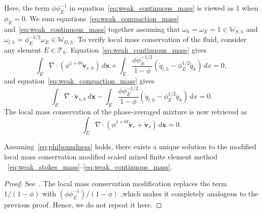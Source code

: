 Here, the term $\phi \phi_E^{-1}$ in equation~\eqref{eq:weak_continuous_mass} is viewed as 1 when $\phi_E = 0$.
We sum equations~\eqref{eq:weak_compaction_mass} and~\eqref{eq:weak_continuous_mass} 
together 
assuming that $\omega_h = \omega_E = 1\in \mathbb{W}_{S,h}$ and $\omega_{l,h} = \phi_E^{-1/2} \omega_E \in \mathbb{W}_{D,h}$. 
To verify local mass conservation of the fluid, consider any element $E \in \mathcal{T}_h$.
Equation~\eqref{eq:weak_continuous_mass} gives
\begin{equation}
		  \int_E \nabla \cdot (\phi^{1+\Theta} \check{\mathbf{v}}_{r,h})\, d\mathbf{x} + \int_E \frac{\phi \phi_E^{-1/2}}{1-\phi} (\check{q}_{l,h} - \phi_E^{1/2}\check{q}_h)\, dx = 0,
\end{equation}
and equation~\eqref{eq:weak_compaction_mass} gives
\begin{equation}
		  \int_E \nabla \cdot \check{\mathbf{v}}_{s,h}\, d\mathbf{x} - \int_E \frac{\phi\phi_E^{-1/2}}{1-\phi} (\check{q}_{l,h} - \phi_E^{1/2}\check{q}_h)\, dx = 0.
\end{equation}
The local mass conservation of the phase-averaged mixture is now retrieved as
\begin{equation}
		  \int_{E}\nabla \cdot (\phi^{1+\Theta}\check{\mathbf{v}}_r + \check{\mathbf{v}}_s)\, d\mathbf{x} = 0.
\end{equation}

\begin{lem}
		  Assuming~\eqref{eq:phiboundness} holds, there exists a unique solution
		  to the modified local mass conservation modified
		  scaled mixed finite element method
		  ~\eqref{eq:weak_stokes_mass}--\eqref{eq:weak_continuous_mass}.
\end{lem}
\begin{proof}
		  See~\cite{DegenerateDarcy}.
		  The local mass conservation modification 
		  replaces the term $1/(1-\phi)$ with $(\phi \phi_E^{-1})/(1-\phi)$
		  ,which makes it completely analogous to the previous
		  proof. Hence, we do not repeat it here.
\end{proof}

\iffalse
